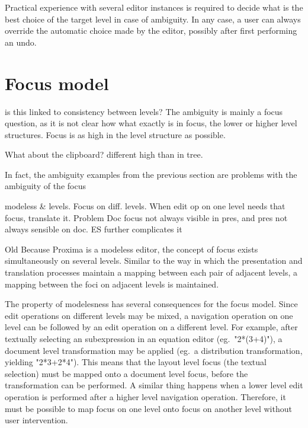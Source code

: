 Practical experience with several editor instances is required to decide what is the best choice of the target level in case of ambiguity. In any case, a user can always override the automatic choice made by the editor, possibly after first performing an undo.




%																
%																
%																
\section{Focus model} \label{sect:focus}

\bc
is this linked to consistency between levels?
The ambiguity is mainly a focus question, as it is not clear how what exactly is in focus, the lower or higher level structures. Focus is as high in the level structure as possible.

What about the clipboard?
different high than in tree.

In fact, the ambiguity examples from the previous section are problems with the ambiguity of the focus
\ec

\bc modeless & levels. Focus on diff. levels. When edit op on one level needs that focus, translate it. Problem Doc focus not always visible in pres, and pres not always sensible on doc. ES further complicates it
\ec


\bc Old
Because Proxima is a modeless editor, the concept of focus exists simultaneously on several levels.  Similar to the way in which the presentation and translation processes maintain a mapping between each pair of adjacent levels, a mapping between the foci on adjacent levels is maintained. 
\ec

The property of modelesness has several consequences for the focus model. Since edit operations on different levels may be mixed, a navigation operation on one level can be followed by an edit operation on a different level. For example, after textually selecting an subexpression in an equation editor (eg.\ "2*(3+4)"), a document level transformation may be applied (eg.\ a distribution transformation, yielding "2*3+2*4"). This means that the layout level focus (the textual selection) must be mapped onto a document level focus, before the transformation can be performed. A similar thing happens when a lower level edit operation is performed after a higher level navigation operation. Therefore, it must be possible to map focus on one level onto focus on another level without user intervention.

